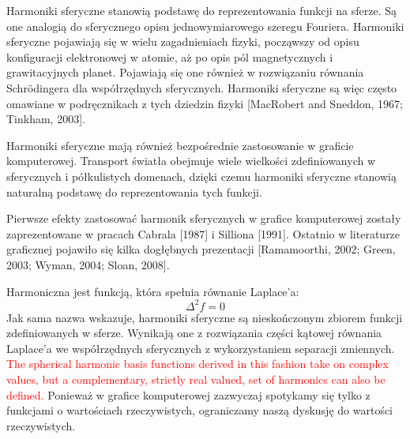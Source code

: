 \documentclass[polish]{article}
\numberwithin{equation}{section}
\begin{document}
Harmoniki sferyczne stanowią podstawę do reprezentowania funkcji na sferze. Są one analogią do sferycznego opisu jednowymiarowego szeregu Fouriera. Harmoniki sferyczne pojawiają się w wielu zagadnieniach fizyki, począwszy od opisu konfiguracji elektronowej w atomie, aż po opis pól magnetycznych i grawitacyjnych planet. Pojawiają się one również w rozwiązaniu równania Schr\"{o}dingera dla współrzędnych sferycznych. Harmoniki sferyczne są więc często omawiane w podręcznikach z tych dziedzin fizyki [MacRobert and Sneddon, 1967; Tinkham,
2003].

Harmoniki sferyczne mają również bezpośrednie zastosowanie w graficie komputerowej. Transport światła obejmuje wiele wielkości zdefiniowanych w sferycznych i półkulistych domenach, dzięki czemu harmoniki sferyczne stanowią naturalną podstawę do reprezentowania tych funkcji.

Pierwsze efekty zastosować harmonik sferycznych w grafice komputerowej zostały zaprezentowane w pracach Cabrala [1987] i Silliona [1991]. Ostatnio w literaturze graficznej pojawiło się kilka dogłębnych prezentacji [Ramamoorthi, 2002; Green, 2003; Wyman, 2004; Sloan, 2008].

\bigskip
Harmoniczna jest funkcją, która spełnia równanie Laplace'a:
\begin{equation}
\Delta^{2}f=0
\end{equation}
Jak sama nazwa wskazuje, harmoniki sferyczne są nieskończonym zbiorem funkcji zdefiniowanych w sferze. Wynikają one z rozwiązania części kątowej równania Laplace'a we współrzędnych sferycznych z wykorzystaniem separacji zmiennych. \textcolor{red}{The spherical harmonic basis functions derived in this fashion take on complex values, but a complementary, strictly real valued, set of harmonics can also be defined.} Ponieważ w grafice komputerowej zazwyczaj spotykamy się tylko z funkcjami o wartościach rzeczywistych, ograniczamy naszą dyskusję do wartości rzeczywistych. \\
\end{document}
